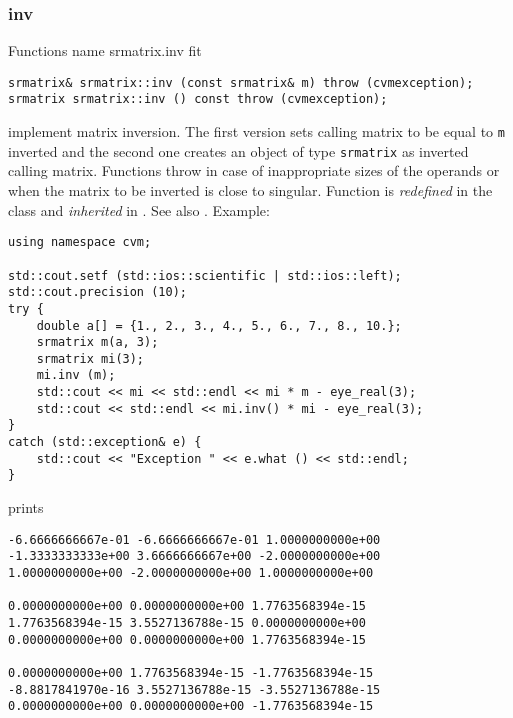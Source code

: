 \subsubsection{inv}
Functions%
\pdfdest name {srmatrix.inv} fit
\begin{verbatim}
srmatrix& srmatrix::inv (const srmatrix& m) throw (cvmexception);
srmatrix srmatrix::inv () const throw (cvmexception);
\end{verbatim}
implement matrix inversion.
The first version sets  calling matrix to be equal to 
\verb"m" inverted and the second one
creates an object of type \verb"srmatrix" as inverted calling matrix.
Functions throw   
in case of inappropriate
sizes of the operands or when the matrix to be inverted is close to
singular.
Function is \emph{redefined} in the class
and \emph{inherited} in .
See also
.
Example:
\begin{Verbatim}
using namespace cvm;

std::cout.setf (std::ios::scientific | std::ios::left); 
std::cout.precision (10);
try {
    double a[] = {1., 2., 3., 4., 5., 6., 7., 8., 10.};
    srmatrix m(a, 3);
    srmatrix mi(3);
    mi.inv (m);
    std::cout << mi << std::endl << mi * m - eye_real(3);
    std::cout << std::endl << mi.inv() * mi - eye_real(3);
}
catch (std::exception& e) {
    std::cout << "Exception " << e.what () << std::endl;
}
\end{Verbatim}
prints
\begin{Verbatim}
-6.6666666667e-01 -6.6666666667e-01 1.0000000000e+00
-1.3333333333e+00 3.6666666667e+00 -2.0000000000e+00
1.0000000000e+00 -2.0000000000e+00 1.0000000000e+00

0.0000000000e+00 0.0000000000e+00 1.7763568394e-15
1.7763568394e-15 3.5527136788e-15 0.0000000000e+00
0.0000000000e+00 0.0000000000e+00 1.7763568394e-15

0.0000000000e+00 1.7763568394e-15 -1.7763568394e-15
-8.8817841970e-16 3.5527136788e-15 -3.5527136788e-15
0.0000000000e+00 0.0000000000e+00 -1.7763568394e-15
\end{Verbatim}
\newpage





